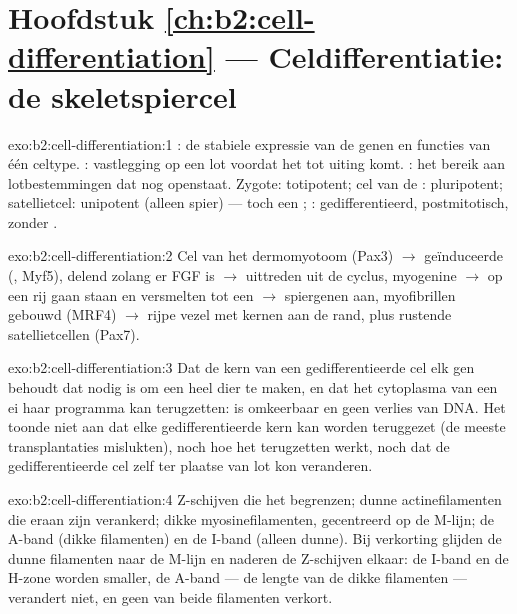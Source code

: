 \section*{Hoofdstuk \ref{ch:b2:cell-differentiation} --- Celdifferentiatie: de skeletspiercel}

\begin{solution}{exo:b2:cell-differentiation:1}
: de stabiele expressie van de genen en functies van één
celtype. : vastlegging op een lot voordat het tot uiting komt.
: het bereik aan lotbestemmingen dat nog openstaat. Zygote:
totipotent; cel van de : pluripotent; satellietcel:
unipotent (alleen spier) --- toch een ; :
gedifferentieerd, postmitotisch, zonder .
\end{solution}

\begin{solution}{exo:b2:cell-differentiation:2}
Cel van het dermomyotoom (Pax3) $\to$ geïnduceerde  (, Myf5),
delend zolang er FGF is $\to$ uittreden uit de cyclus, myogenine $\to$
op een rij gaan staan en versmelten tot een  $\to$ spiergenen aan,
myofibrillen gebouwd (MRF4) $\to$ rijpe vezel met kernen aan de rand, plus
rustende satellietcellen (Pax7).
\end{solution}

\begin{solution}{exo:b2:cell-differentiation:3}
Dat de kern van een gedifferentieerde cel elk gen behoudt dat nodig is om
een heel dier te maken, en dat het cytoplasma van een ei haar programma kan
terugzetten:  is omkeerbaar en geen verlies van DNA. Het
toonde niet aan dat elke gedifferentieerde kern kan worden teruggezet (de
meeste transplantaties mislukten), noch hoe het terugzetten werkt, noch dat
de gedifferentieerde cel zelf ter plaatse van lot kon veranderen.
\end{solution}

\begin{solution}{exo:b2:cell-differentiation:4}
Z-schijven die het  begrenzen; dunne actinefilamenten die eraan
zijn verankerd; dikke myosinefilamenten, gecentreerd op de M-lijn; de A-band
(dikke filamenten) en de I-band (alleen dunne). Bij verkorting glijden de
dunne filamenten naar de M-lijn en naderen de Z-schijven elkaar: de I-band
en de H-zone worden smaller, de A-band --- de lengte van de dikke
filamenten --- verandert niet, en geen van beide filamenten verkort.
\end{solution}

